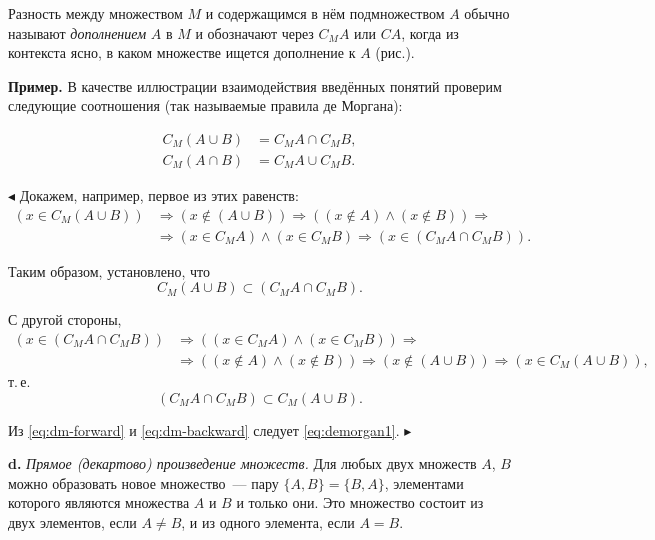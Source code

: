Разность между множеством $M$ и содержащимся в нём подмножеством $A$ обычно называют \emph{дополнением} $A$ в $M$ и обозначают через $C_M A$ или $CA$, когда из контекста ясно, в каком множестве ищется дополнение к $A$ (рис.).

\textbf{Пример.} В качестве иллюстрации взаимодействия введённых понятий проверим следующие соотношения (так называемые правила де Моргана\footnotemark[1]):


\begin{align}
C_M(A \cup B) &= C_M A \cap C_M B, \label{eq:demorgan1} \\
C_M(A \cap B) &= C_M A \cup C_M B. \label{eq:demorgan2}
\end{align}

$\blacktriangleleft$ Докажем, например, первое из этих равенств:
\begin{align*}
(x \in C_M(A \cup B)) &\Rightarrow (x \notin (A \cup B)) \Rightarrow ((x \notin A) \land (x \notin B)) \Rightarrow \\
&\Rightarrow (x \in C_M A) \land (x \in C_M B) \Rightarrow (x \in (C_M A \cap C_M B)).
\end{align*}

Таким образом, установлено, что
\begin{equation}
C_M(A \cup B) \subset (C_M A \cap C_M B). \label{eq:dm-forward}
\end{equation}

С другой стороны,
\begin{align*}
(x \in (C_M A \cap C_M B)) &\Rightarrow ((x \in C_M A) \land (x \in C_M B)) \Rightarrow \\
&\Rightarrow ((x \notin A) \land (x \notin B)) \Rightarrow (x \notin (A \cup B)) \Rightarrow (x \in C_M(A \cup B)),
\end{align*}
т.\,е.
\begin{equation}
(C_M A \cap C_M B) \subset C_M(A \cup B). \label{eq:dm-backward}
\end{equation}

Из \eqref{eq:dm-forward} и \eqref{eq:dm-backward} следует \eqref{eq:demorgan1}. $\blacktriangleright$

\textbf{d.} \emph{Прямое (декартово) произведение множеств.} Для любых двух множеств $A$, $B$ можно образовать новое множество~--- пару $\{A, B\} = \{B, A\}$, элементами которого являются множества $A$ и $B$ и только они. Это множество состоит из двух элементов, если $A \neq B$, и из одного элемента, если $A = B$.

